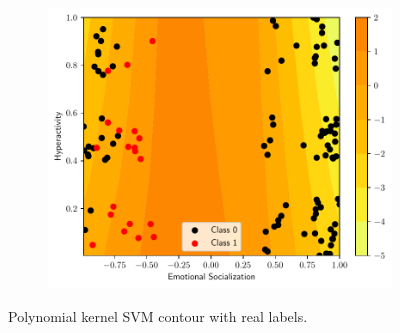 \documentclass[conference]{IEEEtran}
\theoremstyle{definition}
\theoremstyle{remark}
\theoremstyle{remark}
\begin{document}
\begin{figure}
\begin{subfigure}[b]{0.32\textwidth}
        \includegraphics[width=\textwidth]{figs/svm-poly-contour-2-5.pdf}
        \caption{}
    \end{subfigure}
    \caption{Polynomial kernel SVM contour with real labels.}
    \label{fig:SVM-poly}
\end{figure}
\end{document}
